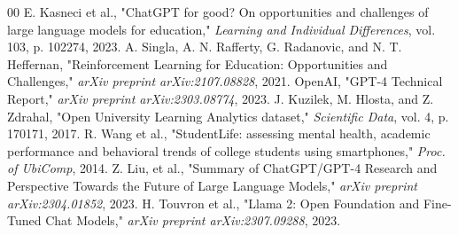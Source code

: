 \documentclass[conference]{IEEEtran}
\begin{document}
\begin{thebibliography}{00}
 E. Kasneci et al., "ChatGPT for good? On opportunities and challenges of large language models for education," \textit{Learning and Individual Differences}, vol. 103, p. 102274, 2023.
 A. Singla, A. N. Rafferty, G. Radanovic, and N. T. Heffernan, "Reinforcement Learning for Education: Opportunities and Challenges," \textit{arXiv preprint arXiv:2107.08828}, 2021.
 OpenAI, "GPT-4 Technical Report," \textit{arXiv preprint arXiv:2303.08774}, 2023.
 J. Kuzilek, M. Hlosta, and Z. Zdrahal, "Open University Learning Analytics dataset," \textit{Scientific Data}, vol. 4, p. 170171, 2017.
 R. Wang et al., "StudentLife: assessing mental health, academic performance and behavioral trends of college students using smartphones," \textit{Proc. of UbiComp}, 2014.
 Z. Liu, et al., "Summary of ChatGPT/GPT-4 Research and Perspective Towards the Future of Large Language Models," \textit{arXiv preprint arXiv:2304.01852}, 2023.
 H. Touvron et al., "Llama 2: Open Foundation and Fine-Tuned Chat Models," \textit{arXiv preprint arXiv:2307.09288}, 2023.
\end{thebibliography}
\end{document}

